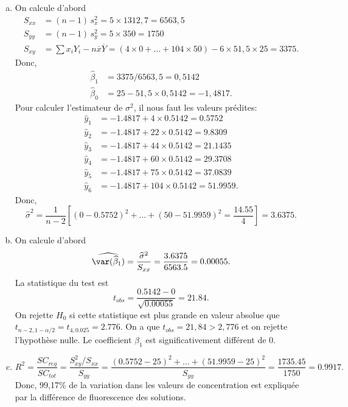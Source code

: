 \documentclass[letter, 11pt]{article}
\begin{document}
\begin{enumerate}[leftmargin=*, wide, label=\bf Exercice \arabic*:]
{\begin{enumerate}[a) ]
\item On calcule d'abord
\begin{align*}
S_{xx} &= (n-1)\,s^2_x = 5\times 1312,7=6563,5 \\
S_{yy} &= (n-1)\,s^2_y = 5\times 350=1750 \\
S_{xy} &= \sum x_iY_i-n\overline x\overline Y=(4\times0 + \ldots + 104\times 50) -6\times 51,5\times 25 = 3375.
\end{align*}
Donc,
\begin{align*}
\widehat{\beta}_1 &= 3375 / 6563,5 = 0,5142 \\
\widehat{\beta}_0 &= 25 - 51,5\times0,5142 = -1,4817.
\end{align*}
Pour calculer l'estimateur de $\sigma^2$, il nous faut les valeurs prédites:
\begin{align*}
\widehat{y}_1 &= -1.4817 + 4 \times 0.5142 = 0.5752 \\
\widehat{y}_2 &= -1.4817 + 22 \times 0.5142 = 9.8309 \\
\widehat{y}_3 &= -1.4817 + 44 \times 0.5142 = 21.1435 \\
\widehat{y}_4 &= -1.4817 + 60 \times 0.5142 = 29.3708 \\
\widehat{y}_5 &= -1.4817 + 75 \times 0.5142 = 37.0839 \\
\widehat{y}_6 &= -1.4817 + 104 \times 0.5142 = 51.9959.
\end{align*}
Donc,
$$ \widehat\sigma^2 = \dfrac{1}{n-2} \left[(0-0.5752)^2 + \ldots +(50-51.9959)^2 = \frac{14.55}{4} \right]= 3.6375. $$


\item On calcule d'abord
 $$ \widehat{\var(\widehat{\beta}_1)}  = \frac{\widehat\sigma^2}{S_{xx}} = \frac{3.6375}{6563.5} = 0.00055.$$
La statistique du test est
$$ t_{obs} = \frac{0.5142 - 0}{\sqrt{0.00055}} =  21.84.$$
On rejette $H_0$ si cette statistique est plus grande en valeur absolue  que $t_{n-2,1-\alpha/2} = t_{4,0.025} = 2.776$. On a que $t_{obs} = 21,84 > 2,776$ et on rejette l'hypothèse nulle. Le coefficient $\beta_1$ est significativement différent de 0.

\item
$$ R^2 = \dfrac{SC_{reg}}{SC_{tot}} = \dfrac{S^2_{xy}/S_{xx}}{S_{yy}}=\frac{(0.5752 -25)^2 + \ldots + (51.9959 - 25)^2}{S_{yy}} = \frac{1735.45}{1750} = 0.9917. $$
Donc, 99,17\% de la variation dans les valeurs de concentration est expliquée par la différence de fluorescence des solutions. 


\end{enumerate}}
\end{enumerate}
\end{document}
